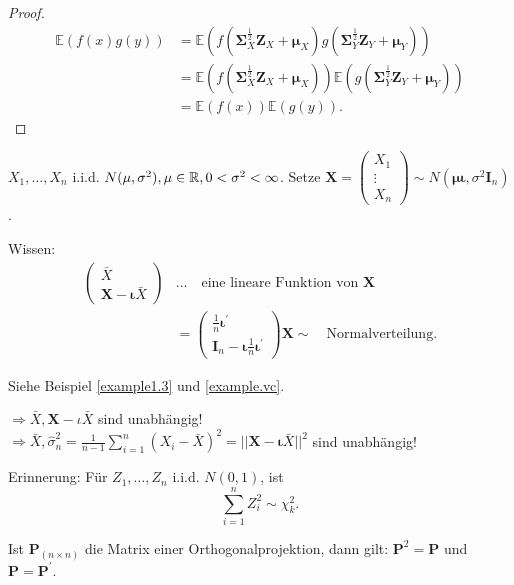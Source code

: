\documentclass{tstextbook}
\begin{document}
\begin{proof}
\begin{align*} \mathbb{E}(f(x)g(y)) & = \mathbb{E}\left( f\left( \boldsymbol{\Sigma}_X^{\frac{1}{2}} \mathbf{Z}_X + \boldsymbol{\mu}_X \right)g\left( \boldsymbol{\Sigma}_Y^{\frac{1}{2}} \mathbf{Z}_Y + \boldsymbol{\mu}_Y \right) \right) \\
	& = \mathbb{E}\left( f\left( \boldsymbol{\Sigma}_X^{\frac{1}{2}} \mathbf{Z}_X + \boldsymbol{\mu}_X \right)\right) \mathbb{E}\left( g\left( \boldsymbol{\Sigma}_Y^{\frac{1}{2}} \mathbf{Z}_Y + \boldsymbol{\mu}_Y \right)\right) \\
	& = \mathbb{E}(f(x)) \mathbb{E}(g(y)).
\end{align*}
\end{proof}

\begin{example}
	$ X_1, \ldots, X_n $ i.i.d. $ N(\mu, \sigma^2), \mu \in \mathbb R, 0 < \sigma^2 < \infty $.
	Setze $ \mathbf{X} = \begin{pmatrix}
		X_1 \\ \vdots \\ X_n
	\end{pmatrix} \sim N(\boldsymbol{\mu}\boldsymbol{\iota}, \sigma^2 \mathbf{I}_n) $.

	Wissen:  
	\[
	\begin{aligned}
	\begin{pmatrix}
		\bar{X} \\ \mathbf{X}- \boldsymbol{\iota} \bar{X}
	\end{pmatrix} & \ldots \quad \text{eine lineare Funktion von } \mathbf{X} \\
	& = \begin{pmatrix}
		\frac{1}{n} \boldsymbol{\iota}^\prime \\ \mathbf{I}_n - \boldsymbol{\iota} \frac{1}{n} \boldsymbol{\iota}^\prime
	\end{pmatrix} \mathbf{X} \sim \quad \text{Normalverteilung.}
	\end{aligned}
	\] 
	
	Siehe Beispiel \href{example1.3}{\ref{example1.3}} und \href{example.vc}{\ref{example.vc}}.
	
	$ \Rightarrow \bar{X}, \mathbf{X}-\iota\bar{X} $ sind unabhängig!\\
	$ \Rightarrow \bar{X}, \hat{\sigma}_n^2 = \frac{1}{n-1} \sum_{i=1}^{n} (X_i-\bar{X})^2 =  ||\mathbf{X}-\boldsymbol{\iota}\bar{X}||^2 $ sind unabhängig!
\end{example}

\begin{remark}
	Erinnerung: Für $ Z_1, \ldots, Z_n $ i.i.d. $ N(0,1) $, ist 
	\[
	\sum_{i=1}^{n} Z_i^2 \sim \chi_k^2.
	\]
\end{remark}
\begin{lemma}
	
	Ist $ \mathbf{P}_{(n \times n)} $ die Matrix einer Orthogonalprojektion, dann gilt: $ \mathbf{P}^2=\mathbf{P} $  und $ \mathbf{P}=\mathbf{P}^\prime $.
\end{lemma}
\end{document}
